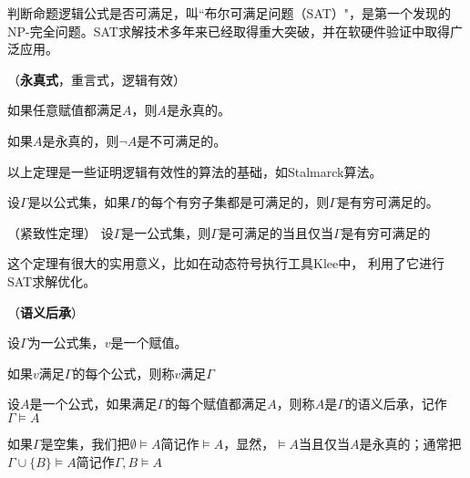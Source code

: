 \begin{note}

判断命题逻辑公式是否可满足，叫``布尔可满足问题（SAT）"，是第一个发现的NP-完全问题。SAT求解技术多年来已经取得重大突破，并在软硬件验证中取得广泛应用。
\end{note}

\begin{defn}（\textbf{永真式}，重言式，逻辑有效）

如果任意赋值都满足$A$，则$A$是永真的。

\end{defn}

\begin{thm}
如果$A$是永真的，则$\neg A$是不可满足的。
\end{thm}

\begin{rem}
以上定理是一些证明逻辑有效性的算法的基础，如Stalmarck算法。
\end{rem}


\begin{defn}
设$\Gamma$是以公式集，如果$\Gamma$的每个有穷子集都是可满足的，则$\Gamma$是有穷可满足的。
\end{defn}

\begin{thm}（紧致性定理）
设$\Gamma$是一公式集，则$\Gamma$是可满足的当且仅当$\Gamma$是有穷可满足的

\end{thm}

\begin{rem}
这个定理有很大的实用意义，比如在动态符号执行工具Klee中， 利用了它进行SAT求解优化。
\end{rem}


\begin{defn}（\textbf{语义后承}）

设$\Gamma$为一公式集，$v$是一个赋值。
\begin{tightenum}
 \item 如果$v$满足$\Gamma$的每个公式，则称$v$满足$\Gamma$
 \item 设$A$是一个公式，如果满足$\Gamma$的每个赋值都满足$A$，则称$A$是$\Gamma$的语义后承，记作$\Gamma \models A$
\end{tightenum}
\end{defn}


\begin{note}

如果$\Gamma$是空集，我们把$\emptyset \models A$简记作$\models A$，显然，$\models A$当且仅当$A$是永真的；通常把$\Gamma \cup \{B \} \models A$简记作$\Gamma, B \models A$

\end{note}


